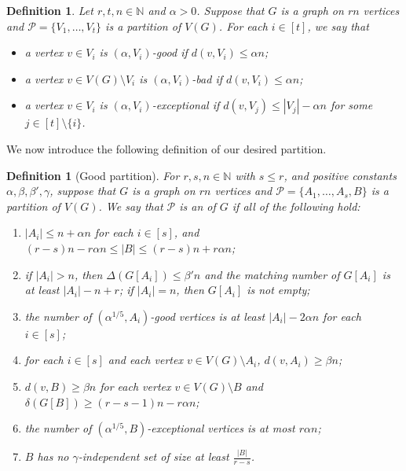 \documentclass[11pt, a4paper]{article}
\newtheorem{definition}[theorem]{Definition}
\theoremstyle{definition}
\newcommand{\<}{\subseteq}
\newcommand{\de}{\delta}
\begin{document}
\begin{definition}\label{def:bad vertex for Ai}
Let $r,t,n\in \mathbb{N}$ and $\alpha>0$. Suppose that $G$ is a graph on $rn$ vertices and   $\mathcal{P}=\{V_1,\ldots,V_t\}$ is a partition of $V(G)$. For each $i\in [t]$, we say that 
\begin{itemize}
    \item a vertex $v\in V_i$ is $(\alpha, V_i)$-good if $d(v,V_i)\le \alpha n$;
    \item a vertex $v\in V(G)\setminus V_i$ is $(\alpha, V_i)$-bad if $d(v,V_i)\le \alpha n$;
    \item a vertex $v\in V_i$ is $(\alpha,V_i)$-exceptional if $d(v,V_j)\le |V_j|-\alpha n$ for some $j\in [t]\setminus \{i\}$.
\end{itemize} 
\end{definition}
We now introduce the following definition of our desired partition.
\begin{definition}[Good partition]\label{def:good partition}
For $r,s,n\in \mathbb{N}$ with $s\le r$, and positive constants $\alpha, \beta,\beta', \gamma$, suppose that $G$ is a graph on $rn$ vertices and $\mathcal{P}=\{A_1,\ldots,A_s,B\}$ is a partition of $V(G)$. We say that $\mathcal{P}$ is an  of $G$ if all of the following hold: 
    \begin{enumerate}
[label =\rm  (A\arabic{enumi})]
    \item\label{B1} $ |A_i|\leq n+\alpha n$ for each $i\in [s]$, and $(r-s)n-r\alpha n\leq|B|\leq (r-s)n+r\alpha n$; %
    \item\label{B2}  if $|A_i|>n$, then $\Delta(G[A_i])\leq \beta' n$ and the matching number of $G[A_i]$ is at least ${|A_i|-n+r}$; if $|A_i|=n$, then $G[A_i]$ is not empty;
    \item\label{B03} the number of $(\alpha^{1/5},A_i)$-good vertices is at least $|A_i|-2\alpha n$ for each $i\in[s]$; 
    \item\label{B04} for each $i\in [s]$ and each vertex $v\in V(G)\setminus A_i$, $d(v,A_i)\geq \beta n$;
    \item\label{B05} $d(v,B)\geq \beta n$ for each vertex $v\in V(G)\setminus B$ and $\de(G[B])\ge (r-s-1)n-r\alpha n$;
    \item\label{B06} the number of $(\alpha^{1/5},B)$-exceptional vertices is at most $r\alpha n$;

    \item\label{B07} %
    $B$ has no $\gamma$-independent set of size at least $\frac{|B|}{r-s}$.
\end{enumerate}
\end{definition}
\end{document}
